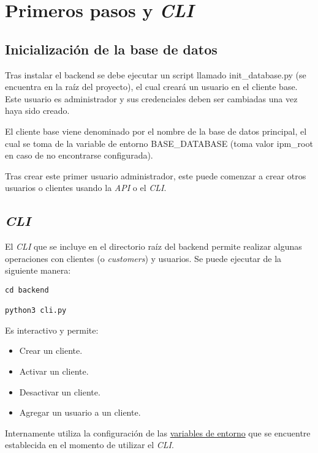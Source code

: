 \chapter{Primeros pasos y \textit{CLI}}

\section{Inicialización de la base de datos}
Tras instalar el backend se debe ejecutar un script llamado \textsf{init\_database.py} (se encuentra en la raíz del proyecto), el cual creará un usuario en el cliente base. Este usuario es administrador y sus credenciales deben ser cambiadas una vez haya sido creado.

El cliente base viene denominado por el nombre de la base de datos principal, el cual se toma de la variable de entorno \textsf{BASE\_DATABASE} (toma valor \textsf{ipm\_root} en caso de no encontrarse configurada).

Tras crear este primer usuario administrador, este puede comenzar a crear otros usuarios o clientes usando la \textit{API} o el \textit{CLI}.

\section{\textit{CLI}}

El \textit{CLI} que se incluye en el directorio raíz del backend permite realizar algunas operaciones con clientes (o \textit{customers}) y usuarios. Se puede ejecutar de la siguiente manera:

\begin{lstlisting}
cd backend

python3 cli.py
\end{lstlisting}

Es interactivo y permite:

\begin{itemize}
	\item Crear un cliente.
	\item Activar un cliente.
	\item Desactivar un cliente.
	\item Agregar un usuario a un cliente.
\end{itemize}

Internamente utiliza la configuración de las \hyperref[sec:variables]{variables de entorno} que se encuentre establecida en el momento de utilizar el \textit{CLI}.